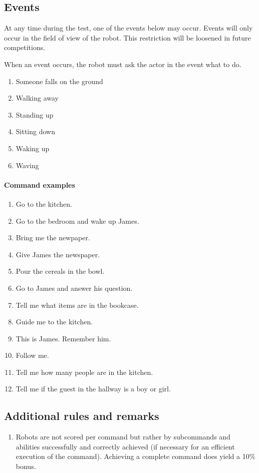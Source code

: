\subsection{Events}
At any time during the test, one of the events below may occur. 
Events will only occur in the field of view of the robot. 
This restriction will be loosened in future competitions. 

When an event occurs, the robot must ask the actor in the event what to do. 
\begin{enumerate}
 \item Someone falls on the ground
 \item Walking away
 \item Standing up
 \item Sitting down
 \item Waking up
 \item Waving
\end{enumerate}


\paragraph{Command examples}
\begin{enumerate}
 \item Go to the kitchen.
 \item Go to the bedroom and wake up James.
 \item Bring me the newpaper.
 \item Give James the newspaper.
 \item Pour the cereals in the bowl.
 \item Go to James and answer his question.
 \item Tell me what items are in the bookcase.
 \item Guide me to the kitchen.
 \item This is James. Remember him.
 \item Follow me.
 \item Tell me how many people are in the kitchen.
 \item Tell me if the guest in the hallway is a boy or girl.
\end{enumerate}

\subsection{Additional rules and remarks}
\label{sec:eegpsr_remarks}
\begin{enumerate}
  \item Robots are not scored per command but rather by subcommands and abilities successfully and correctly achieved (if necessary for an efficient execution of the command). 
    Achieving a complete command does yield a 10\% bonus. 
\end{enumerate}

